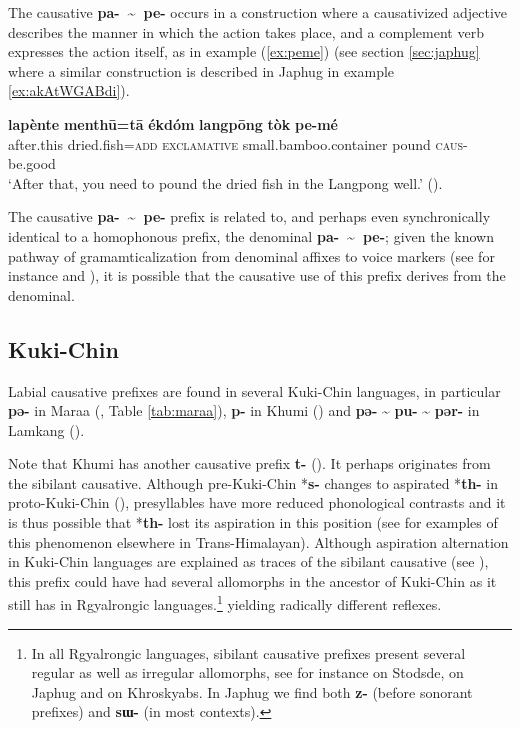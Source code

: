 \documentclass[oneside,a4paper,11pt]{article}
\newcommand{\ipa}[1]{\textbf{{\phon\mbox{#1}}}} %
\newcommand{\refb}[1]{(\ref{#1})}
\newcommand{\tld}{\textasciitilde{}}
\begin{document}
The causative \ipa{pa- \tld{} pe-} occurs in a construction where a causativized adjective describes the manner in which the action takes place, and a complement verb expresses the action itself, as in example \refb{ex:peme} (see section \ref{sec:japhug} where a similar construction is described in Japhug in example \ref{ex:akAtWGABdi}).

\begin{exe}
\ex \label{ex:peme}
\gll 
\ipa{lapènte} 	\ipa{menthū=tā} 	\ipa{ékdóm} 	\ipa{langpōng} 	\ipa{tòk} 	\ipa{pe-mé} \\
after.this dried.fish=\textsc{add} \textsc{exclamative} small.bamboo.container pound \textsc{caus}-be.good\\
\glt `After that, you need to pound the dried fish in the Langpong well.' (\citealt[124]{konnerth14karbi}).
\end{exe}

The causative \ipa{pa- \tld{} pe-} prefix is related to, and perhaps even synchronically identical to a homophonous prefix, the denominal \ipa{pa- \tld{} pe-}; given the known pathway of gramamticalization from denominal affixes to voice markers (see for instance \citealt{jacques14antipassive} and \citealt{jacques15causative}), it is possible that the causative use of this prefix derives from the denominal.

\subsection{Kuki-Chin}  \label{sec:kc}
Labial causative prefixes are found in several Kuki-Chin languages, in particular \ipa{pə-} in Maraa (\citealt[139]{hartmann01prenasalization}, Table \ref{tab:maraa}), \ipa{p-} in Khumi (\citealt[99]{peterson10elaborate}) and \ipa{pə-} \tld{} \ipa{pu-} \tld{} \ipa{pər-} in Lamkang (\citealt[52-4]{chelliah07lamkang}).

Note that Khumi has another causative prefix \ipa{t-} (\citealt[12]{hartmann13valence}). It perhaps originates from the sibilant causative. Although pre-Kuki-Chin *\ipa{s-} changes to aspirated *\ipa{th-} in proto-Kuki-Chin (\citealt[16]{vanbik09pkc}), presyllables have more reduced phonological contrasts and it is thus possible that *\ipa{th-} lost its aspiration in this position (see \citealt{jacques12agreement} for examples of this phenomenon elsewhere in Trans-Himalayan). Although aspiration alternation in Kuki-Chin languages are explained as traces of the sibilant causative (see \citealt[220;259]{vanbik09pkc}), this prefix could have had several allomorphs in the ancestor of Kuki-Chin as it still has in Rgyalrongic languages.\footnote{In all Rgyalrongic languages, sibilant causative prefixes present several regular as well as irregular allomorphs, see for instance \citet{jackson07shangzhai} on Stodsde, \citet{jacques15causative} on Japhug and \citet{lai16caus} on Khroskyabs. In Japhug we find both \ipa{z-} (before sonorant prefixes) and \ipa{sɯ-} (in most contexts).} yielding radically different reflexes.
\end{document}
